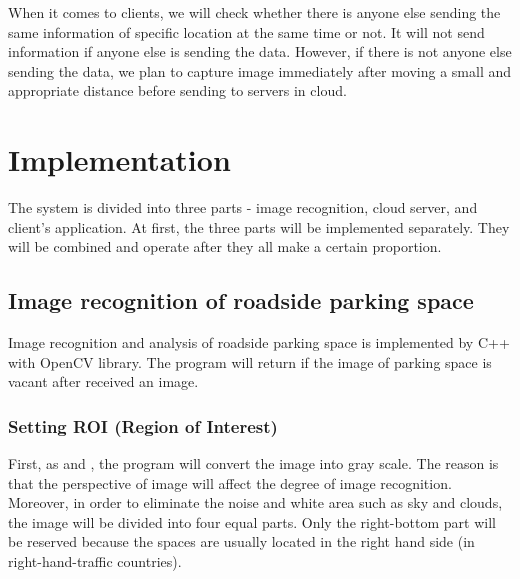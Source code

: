 \documentclass[preprint,12pt]{elsarticle}
\begin{document}
When it comes to clients, we will check whether there is anyone else
sending the same information of specific location at the same time or
not. It will not send information if anyone else is sending the data.
However, if there is not anyone else sending the data, we plan to
capture image immediately after moving a small and appropriate distance
before sending to servers in cloud.

\section{Implementation}\label{sec:implementation}

The system is divided into three parts - image recognition, cloud
server, and client's application. At first, the three parts will be implemented
separately. They will be combined and operate after they all make a certain proportion.

\subsection{Image recognition of roadside parking space}

Image recognition and analysis of roadside parking space is implemented by C++ with
OpenCV library. The program will return if the image of parking space is
vacant after received an image.

\subsubsection{Setting ROI (Region of Interest)}

First, as  and , the program will convert the image into gray scale. The reason is
that the perspective of image will affect the degree of image
recognition. Moreover, in order to eliminate the noise and white area such
as sky and clouds, the image will be divided into four equal parts.
Only the right-bottom part will be reserved because the spaces are
usually located in the right hand side (in right-hand-traffic countries).
\end{document}
